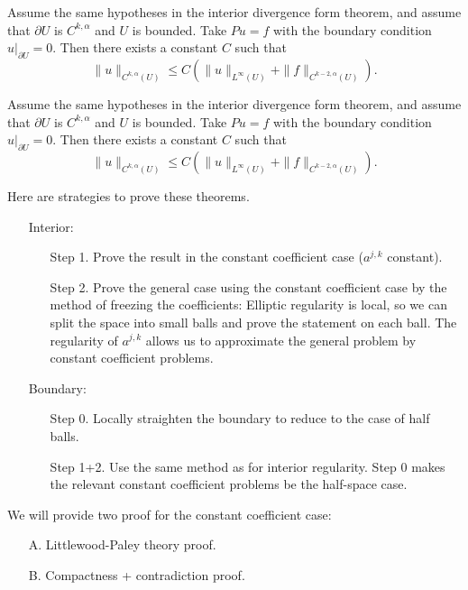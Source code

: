 \begin{theorem}
\label{thm: Schauder, boundary regularity, divergence form}
 Assume the same hypotheses in the interior divergence form theorem, and assume that $\partial U$ is $C^{k, \alpha}$ and $U$ is bounded. Take $P u=f$ with the boundary condition $\left.u\right|_{\partial U}=0$. Then there exists a constant $C$ such that
$$
\|u\|_{C^{k, \alpha}(U)} \leq C\left(\|u\|_{L^\infty(U)}+\|f\|_{C^{k-2, \alpha}(U)}\right) .
$$
\end{theorem}



\begin{theorem}
\label{thm: Schauder, boundary regularity, non-divergence form}
Assume the same hypotheses in the interior divergence form theorem, and assume that $\partial U$ is $C^{k, \alpha}$ and $U$ is bounded. Take $P u=f$ with the boundary condition $\left.u\right|_{\partial U}=0$. Then there exists a constant $C$ such that
$$
\|u\|_{C^{k, \alpha}(U)} \leq C\left(\|u\|_{L^\infty(U)}+\|f\|_{C^{k-2, \alpha}(U)}\right) .
$$
\end{theorem}

Here are strategies to prove these theorems. 
\begin{itemize}
    \item []Interior:
    \begin{itemize}
        \item [] Step 1. Prove the result in the constant coefficient case ($a^{j,k}$ constant).
        \item [] Step 2.  Prove the general case using the constant coefficient case by the method of freezing the coefficients: Elliptic regularity is local, so we can split the space into small balls and prove the statement on each ball. The regularity of $a^{j,k}$ allows us to approximate the general problem by constant coefficient problems. 
    \end{itemize}
    \item [] Boundary:
    \begin{itemize}
        \item []     Step 0. Locally straighten the boundary to reduce to the case of half balls. 
        \item []    Step 1+2. Use the same method as for interior regularity. Step 0 makes the relevant constant coefficient problems be the half-space case.
    \end{itemize}
\end{itemize}
We will provide two proof for the constant coefficient case:
\begin{itemize}
    \item [A.] Littlewood-Paley theory proof. 
    \item [B.] Compactness + contradiction proof. 
\end{itemize}

